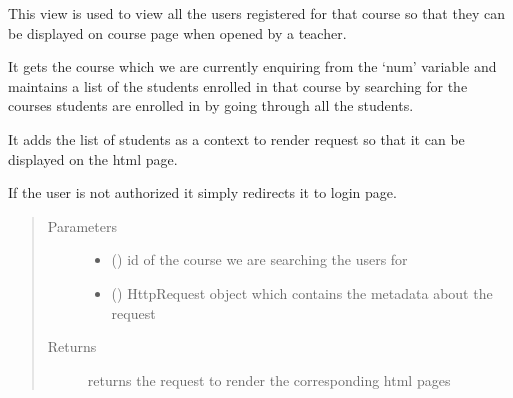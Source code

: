 \documentclass[letterpaper,10pt,english]{sphinxmanual}
\begin{document}

\begin{fulllineitems}
\label{\detokenize{users:users.views.course_page}}
\sphinxAtStartPar
This view is used to view all the users registered for that course so that they can be displayed on course page when opened by a teacher.

\sphinxAtStartPar
It gets the course which we are currently enquiring from the ‘num’ variable and maintains a list of the students enrolled in that course by searching for the courses students are enrolled in by going through all the students.

\sphinxAtStartPar
It adds the list of students as a context to render request so that it can be displayed on the html page.

\sphinxAtStartPar
If the user is not authorized it simply redirects it to login page.
\begin{quote}\begin{description}
\item[{Parameters}] \leavevmode\begin{itemize}
\item {} 
\sphinxAtStartPar
{} () \textendash{} id of the course we are searching the users for

\item {} 
\sphinxAtStartPar
{} () \textendash{} HttpRequest object which contains the metadata about the request

\end{itemize}

\item[{Returns}] \leavevmode
\sphinxAtStartPar
returns the request to render the corresponding html pages

\end{description}\end{quote}

\end{fulllineitems}

\end{document}
